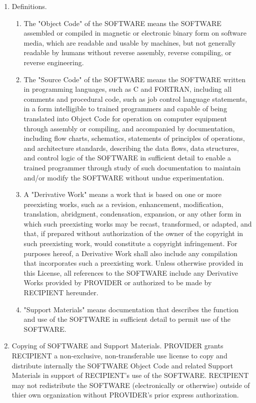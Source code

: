 \begin{enumerate}
\item Definitions.
  \begin{enumerate} 
  \item The "Object Code" of the SOFTWARE means the SOFTWARE assembled
  or compiled in magnetic or electronic binary form on software media,
  which are readable and usable by machines, but not generally
  readable by humans without reverse assembly, reverse compiling, or
  reverse engineering.
  \item The "Source Code" of the SOFTWARE means the SOFTWARE written
  in programming languages, such as C and FORTRAN, including all
  comments and procedural code, such as job control language
  statements, in a form intelligible to trained programmers and
  capable of being translated into Object Code for operation on
  computer equipment through assembly or compiling, and accompanied by
  documentation, including flow charts, schematics, statements of
  principles of operations, and architecture standards, describing the
  data flows, data structures, and control logic of the SOFTWARE in
  sufficient detail to enable a trained programmer through study of
  such documentation to maintain and/or modify the SOFTWARE without
  undue experimentation.
  \item A "Derivative Work" means a work that is based on one or more
  preexisting works, such as a revision, enhancement, modification,
  translation, abridgment, condensation, expansion, or any other form
  in which such preexisting works may be recast, transformed, or
  adapted, and that, if prepared without authorization of the owner of
  the copyright in such preexisting work, would constitute a copyright
  infringement.  For purposes hereof, a Derivative Work shall also
  include any compilation that incorporates such a preexisting work.
  Unless otherwise provided in this License, all references to the
  SOFTWARE include any Derivative Works provided by PROVIDER or
  authorized to be made by RECIPIENT hereunder.
  \item "Support Materials" means documentation that describes the
  function and use of the SOFTWARE in sufficient detail to permit use
  of the SOFTWARE.  
  \end{enumerate}

\item Copying of SOFTWARE and Support Materials.  PROVIDER grants RECIPIENT
a non-exclusive, non-transferable use license to copy and distribute
internally the SOFTWARE Object Code and related Support Materials in
support of RECIPIENT's use of the SOFTWARE. 
RECIPIENT may not redistribute the SOFTWARE (electronically 
or otherwise) outside of thier own 
organization without PROVIDER's prior express authorization.


\end{enumerate}
